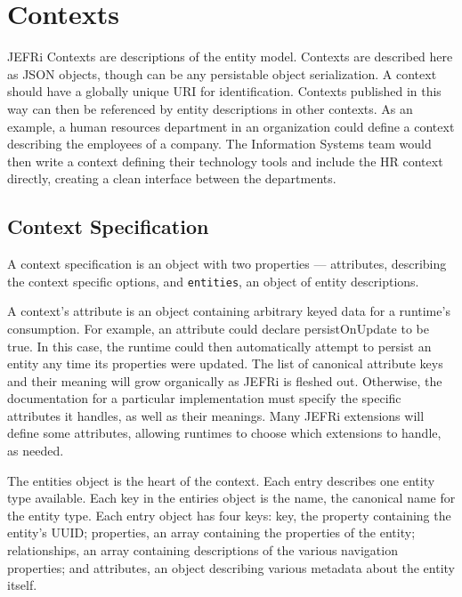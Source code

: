 \documentclass{article}
\begin{document}
\section{Contexts}

JEFRi Contexts are descriptions of the entity model. Contexts are described here
as JSON objects, though can be any persistable object serialization.  A context
should have a globally unique URI for identification. Contexts published in this
way can then be referenced by entity descriptions in other contexts. As an
example, a human resources department in an organization could define a context
describing the employees of a company. The Information Systems team would then
write a context defining their technology tools and include the HR context
directly, creating a clean interface between the departments.

\subsection{Context Specification}

A context specification is an object with two properties --- {\ilcode
attributes}, describing the context specific options, and {\tt entities}, an
object of entity descriptions.

A context's {\ilcode attribute} is an object containing arbitrary keyed data for
a runtime's consumption. For example, an {\ilcode attribute} could declare
{\ilcode persistOnUpdate} to be true. In this case, the runtime could then
automatically attempt to persist an entity any time its properties were updated.
The list of canonical {\ilcode attribute} keys and their meaning will grow
organically as JEFRi is fleshed out. Otherwise, the documentation for a
particular implementation must specify the specific attributes it handles, as
well as their meanings. Many JEFRi extensions will define some attributes,
allowing runtimes to choose which extensions to handle, as needed.

The {\ilcode entities} object is the heart of the context. Each entry describes
one entity type available. Each key in the {\ilcode entiries} object is the
{\ilcode name}, the canonical name for the entity type. Each entry object has
four keys: {\ilcode key}, the property containing the entity's UUID; {\ilcode
properties}, an array containing the properties of the entity; {\ilcode
relationships}, an array containing descriptions of the various navigation
properties; and {\ilcode attributes}, an object describing various metadata
about the entity itself.
\end{document}
